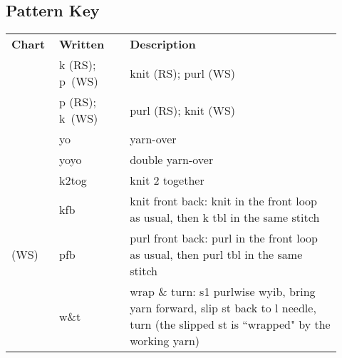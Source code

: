 \documentclass[12pt]{article}
\begin{document}
\begin{titlingpage}
\begin{multicols}{2}
\subsection*{Pattern Key}


\begin{center}
\begin{tabular}{| C{0.12\linewidth}  C{0.2\linewidth}  p{0.6\linewidth} | }
\thickhline {} 
\textbf{Chart}	& \textbf{Written}	& \textbf{Description} \\ \thickhline
\chart{-}	& k (RS); p~(WS)	&  knit (RS); purl (WS)	\\
\chart{=} 	& p (RS); k~(WS)	& purl (RS); knit (WS)  \\
 	& yo		& yarn-over  \\
	& yoyo	& double yarn-over \\
\chart{>}	& k2tog 	& knit 2 together \\
{}		& kfb		& knit front back: knit in the front loop as usual, then k tbl in the same stitch \\
 (WS)	& pfb		& purl front back: purl in the front loop as usual, then purl tbl in the same stitch\\
{}		& w\&t 	& wrap \& turn: s1 purlwise wyib, bring yarn forward, slip st back to l needle, turn (the slipped st is ``wrapped" by the working yarn) \\
\hline
\end{tabular}
\end{center}
\end{multicols}

\end{titlingpage}
\end{document}
